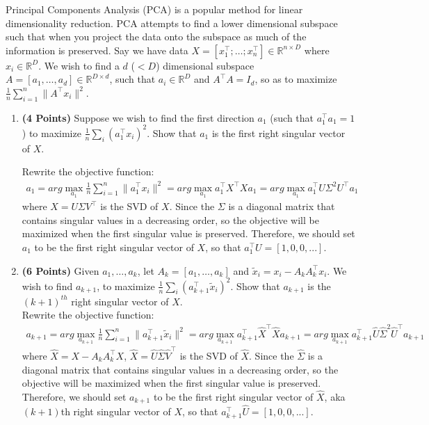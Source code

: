 \documentclass[a4paper]{article}
\theoremstyle{definition}
\newcommand{\RR}{\mathbb{R}}
\newenvironment{soln}{
    \leavevmode\color{blue}\ignorespaces
}{}
\begin{document}
Principal Components Analysis (PCA) is a popular method for linear dimensionality reduction. PCA attempts to find a lower dimensional subspace such that when you project the data onto the subspace as much of the information is preserved. Say we have data $X = [x_1^\top; \dots; x_n^\top] \in \RR^{n\times D}$ where  $x_i \in \RR^D$. We wish to find a $d$ ($ < D$) dimensional subspace $A = [a_1, \dots, a_d] \in \RR^{D\times d}$, such that $ a_i \in \RR^D$ and $A^\top A = I_d$, so as to maximize $\frac{1}{n} \sum_{i=1}^n \|A^\top x_i\|^2$.
\begin{enumerate}

\item  \textbf{(4 Points)}
Suppose we wish to find the first direction $a_1$ (such that $a_1^\top a_1 = 1$) to maximize $\frac{1}{n} \sum_i (a_1^\top x_i)^2$.
Show that $a_1$ is the first right singular vector of $X$.

\begin{soln}
Rewrite the objective function:\\
\begin{align}
    a_1 = arg \max_{a_1} \frac{1}{n} \sum_{i=1}^n \|a_1^\top x_i\|^2 = arg \max_{a_1} a_1^\top X^\top X a_1 = arg \max_{a_1} a_1^\top U \Sigma^2 U^\top a_1 
\end{align}
where $X = U \Sigma V^\top$ is the SVD of $X$. Since the $\Sigma$ is a diagonal matrix that contains singular values in a decreasing order, so the objective will be maximized when the first singular value is preserved. Therefore, we should set $a_1$ to be the first right singular vector of $X$, so that $a_1^\top U = [1, 0, 0,...]$.\\
\end{soln}

\item  \textbf{(6 Points)}
Given $a_1, \dots, a_k$, let $A_k = [a_1, \dots, a_k]$ and 
$\tilde{x}_i = x_i - A_kA_k^\top x_i$. We wish to find $a_{k+1}$, to maximize
$\frac{1}{n} \sum_i (a_{k+1}^\top \tilde{x}_i)^2$. Show that $a_{k+1}$ is the
$(k+1)^{th}$ right singular vector of $X$.
\begin{soln}\\
Rewrite the objective function:\\
\begin{align}
    a_{k+1} = arg \max_{a_{k+1}} \frac{1}{n} \sum_{i=1}^n \|a_{k+1}^\top \tilde{x}_i\|^2 = arg \max_{a_{k+1}} a_{k+1}^\top \hat{X}^\top \hat{X} a_{k+1} = arg \max_{a_{k+1}} a_{k+1}^\top \hat{U} \hat{\Sigma}^2 \hat{U}^\top a_{k+1}
\end{align}
where $\hat{X} = X - A_k A_k^\top X$, $\hat{X} = \hat{U} \hat{\Sigma} \hat{V}^\top$ is the SVD of $\hat{X}$. Since the $\hat{\Sigma}$ is a diagonal matrix that contains singular values in a decreasing order, so the objective will be maximized when the first singular value is preserved. Therefore, we should set $a_{k+1}$ to be the first right singular vector of $\hat{X}$, aka $(k+1)$th right singular vector of $X$, so that $a_{k+1}^\top \hat{U} = [1, 0, 0,...]$.\\
\end{soln}
\end{enumerate}
\end{document}
